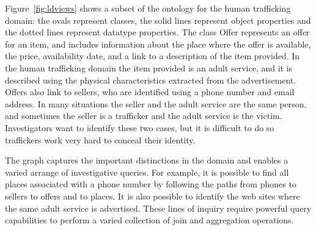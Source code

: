 Figure~\ref{fig:ldviews} shows a subset of the ontology for the human trafficking domain: the ovals represent classes, the solid lines represent object properties and the dotted lines represent datatype properties.
The class Offer represents an offer for an item, and includes information about the place where the offer is available, the price, availability date, and a link to a description of the item provided.
In the human trafficking domain the item provided is an adult service, and it is described using the physical characteristics extracted from the advertisement. 
Offers also link to sellers, who are identified using a phone number and email address.
In many situations the seller and the adult service are the same person, and sometimes the seller is a trafficker and the adult service is the victim.
Investigators want to identify these two cases, but it is difficult to do so traffickers work very hard to conceal their identity.

The graph captures the important distinctions in the domain and enables a varied arrange of investigative queries.
For example, it is possible to find all places associated with a phone number by following the paths from phones to sellers to offers and to places.
It is also possible to identify the web sites where the same adult service is advertised.
These lines of inquiry require powerful query capabilities to perform a varied collection of join and aggregation operations.